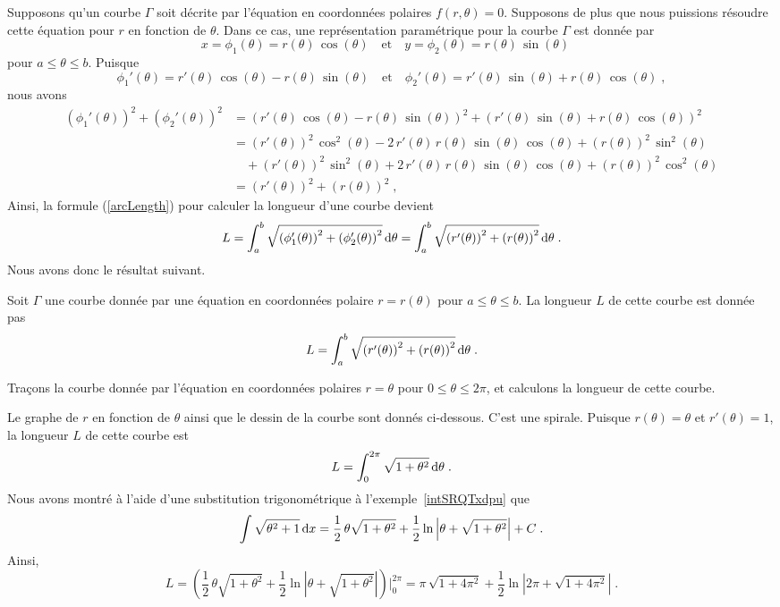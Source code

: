 {Supposons qu'un courbe $\Gamma$ soit décrite par l'équation en
coordonnées polaires $f(r,\theta)=0$.  Supposons de plus que nous
puissions résoudre cette équation pour $r$ en fonction de $\theta$.  Dans
ce cas, une représentation paramétrique pour la courbe $\Gamma$ est
donnée par
\[
x=\phi_1(\theta) = r(\theta)\,\cos(\theta) \quad \text{et} \quad
y= \phi_2(\theta) = r(\theta)\,\sin(\theta) \quad
\]
pour $a\leq \theta \leq b$.  Puisque
\[
\phi_1'(\theta) = r'(\theta)\,\cos(\theta) - r(\theta)\,\sin(\theta)
\quad \text{et} \quad
\phi_2'(\theta) = r'(\theta)\,\sin(\theta) + r(\theta)\,\cos(\theta) \; ,
\]
nous avons
\begin{align*}
\left(\phi_1'(\theta)\right)^2 + \left(\phi_2'(\theta)\right)^2
&= \left( r'(\theta)\,\cos(\theta) - r(\theta)\,\sin(\theta)\right)^2
+ \left(r'(\theta)\,\sin(\theta) + r(\theta)\,\cos(\theta)\right)^2 \\
&= \left(r'(\theta)\right)^2\,\cos^2(\theta)
-2\,r'(\theta)\,r(\theta)\,\sin(\theta)\,\cos(\theta)
+\left(r(\theta)\right)^2\,\sin^2(\theta)\\
&\quad +\left(r'(\theta)\right)^2\,\sin^2(\theta)
+2\,r'(\theta)\,r(\theta)\,\sin(\theta)\,\cos(\theta)
+\left(r(\theta)\right)^2\,\cos^2(\theta) \\
&= \left(r'(\theta)\right)^2 + \left(r(\theta)\right)^2 \; ,
\end{align*}
Ainsi, la formule (\ref{arcLength}) pour calculer la longueur d'une
courbe devient
\[
L = \int_a^b \sqrt{\left(\phi_1'(\theta)\right)^2
+ \left(\phi_2'(\theta)\right)^2} \,\mathrm{d}\theta
= \int_a^b
\sqrt{\left(r'(\theta)\right)^2 + \left(r(\theta)\right)^2}
\,\mathrm{d}\theta \; .
\]
Nous avons donc le résultat suivant.

\begin{prop}
Soit $\Gamma$ une courbe donnée par une équation en coordonnées
polaire $r = r(\theta)$ pour $a \leq \theta \leq b$.  La longueur $L$
de cette courbe est donnée pas
\begin{equation} \label{arclengthPolar}
L = \int_a^b
\sqrt{\left(r'(\theta)\right)^2 + \left(r(\theta)\right)^2}
\,\mathrm{d}\theta \; .
\end{equation}
\end{prop}

\begin{egg}
Traçons la courbe donnée par l'équation en coordonnées polaires
$r=\theta$ pour $0\leq \theta \leq 2\pi$, et calculons la longueur de
cette courbe.

Le graphe de $r$ en fonction de $\theta$ ainsi que le dessin de la
courbe sont donnés ci-dessous.
C'est une spirale.  Puisque $r(\theta) = \theta$ et
$r'(\theta)= 1$, la longueur $L$ de cette courbe est
\[
L = \int_0^{2\pi} \sqrt{1 + \theta^2} \,\mathrm{d}\theta \; .
\]
Nous avons montré à l'aide d'une substitution trigonométrique à
l'exemple~\ref{intSRQTxdpu} que
\[
\int \sqrt{\theta^2+1} \,\mathrm{d}x = \frac{1}{2}\, \theta\sqrt{1+\theta^2}
+ \frac{1}{2} \ln\left|\theta + \sqrt{1+\theta^2}\right| + C\; .
\]
Ainsi,
\[
L = \left( \frac{1}{2}\, \theta\sqrt{1+\theta^2}
+ \frac{1}{2} \ln\left|\theta + \sqrt{1+\theta^2}\right|\right)\bigg|_0^{2\pi}
= \pi\,\sqrt{1+4\pi^2} +
\frac{1}{2} \ln\left|2\pi+\sqrt{1+4\pi^2}\right| \; .
\]
\end{egg}

}
